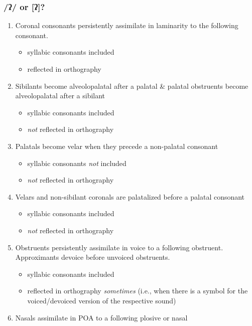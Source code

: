 \documentclass[a4paper,11pt,oneside,openany]{memoir}
\newcommand{\bripa}[1]{[#1]}
\newcommand{\phipa}[1]{/#1/}
\newcommand{\glotstop}{ʔ}
\begin{document}
\subsubsection{\phipa{\glotstop} or \bripa{\glotstop}?}

\begin{enumerate}
    \item Coronal consonants persistently assimilate in laminarity to the following consonant.
    \begin{itemize}
        \item syllabic consonants included
        \item reflected in orthography
    \end{itemize}
    \item Sibilants become alveolopalatal after a palatal \& palatal obstruents become alveolopalatal after a sibilant
    \begin{itemize}
        \item syllabic consonants included
        \item \emph{not} reflected in orthography
    \end{itemize}
    \item Palatals become velar when they precede a non-palatal consonant
    \begin{itemize}
        \item syllabic consonants \emph{not} included
        \item \emph{not} reflected in orthography
    \end{itemize}
    \item Velars and non-sibilant coronals are palatalized before a palatal consonant
    \begin{itemize}
        \item syllabic consonants included
        \item \emph{not} reflected in orthography
    \end{itemize}
    \item Obstruents persistently assimilate in voice to a following obstruent. Approximants devoice before unvoiced obstruents.
    \begin{itemize}
        \item syllabic consonants included
        \item reflected in orthography \emph{sometimes} (i.e., when there is a symbol for the voiced/devoiced version of the respective sound)
    \end{itemize}
    \item Nasals assimilate in POA to a following plosive or nasal

\end{enumerate}
\end{document}
